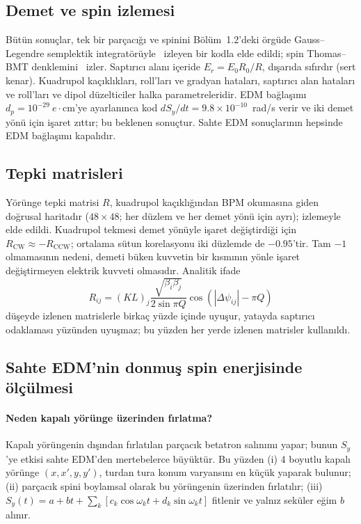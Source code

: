 \documentclass[12pt,a4paper]{extarticle}
\begin{document}
\subsection{Demet ve spin izlemesi}
Bütün sonuçlar, tek bir parçacığı ve spinini Bölüm~1.2'deki örgüde Gauss--Legendre semplektik
integratörüyle~\cite{hairer} izleyen bir kodla elde edildi; spin Thomas--BMT denklemini~\cite{bmt1959}
izler. Saptırıcı alanı içeride $E_r=E_0R_0/R$, dışarıda sıfırdır (sert kenar). Kuadrupol kaçıklıkları,
roll'ları ve gradyan hataları, saptırıcı alan hataları ve roll'ları ve dipol düzelticiler halka
parametreleridir. EDM bağlaşımı $d_p=10^{-29}~e\cdot$cm'ye ayarlanınca kod $dS_y/dt=9.8\times10^{-10}$~rad/s
verir ve iki demet yönü için işaret zıttır; bu beklenen sonuçtur. Sahte EDM sonuçlarının hepsinde EDM
bağlaşımı kapalıdır.

\subsection{Tepki matrisleri}
Yörünge tepki matrisi $R$, kuadrupol kaçıklığından BPM okumasına giden doğrusal haritadır ($48\times48$;
her düzlem ve her demet yönü için ayrı); izlemeyle elde edildi. Kuadrupol tekmesi demet yönüyle işaret
değiştirdiği için $R_\text{CW}\approx-R_\text{CCW}$; ortalama sütun korelasyonu iki düzlemde de $-0.95$'tir.
Tam $-1$ olmamasının nedeni, demeti büken kuvvetin bir kısmının yönle işaret değiştirmeyen elektrik kuvveti
olmasıdır. Analitik ifade
\begin{equation}
R_{ij}=(KL)_j\frac{\sqrt{\beta_i\beta_j}}{2\sin\pi Q}\cos(|\Delta\psi_{ij}|-\pi Q)
\label{eq:R}
\end{equation}
düşeyde izlenen matrislerle birkaç yüzde içinde uyuşur, yatayda saptırıcı odaklaması yüzünden uyuşmaz; bu
yüzden her yerde izlenen matrisler kullanıldı.

\subsection{Sahte EDM'nin donmuş spin enerjisinde ölçülmesi}\label{sec:donmus}
\paragraph{Neden kapalı yörünge üzerinden fırlatma?} Kapalı yörüngenin dışından fırlatılan parçacık
betatron salınımı yapar; bunun $S_y$'ye etkisi sahte EDM'den mertebelerce büyüktür. Bu yüzden (i) 4 boyutlu
kapalı yörünge $(x,x',y,y')$, turdan tura konum varyansını en küçük yaparak bulunur; (ii) parçacık spini
boylamsal olarak bu yörüngenin üzerinden fırlatılır; (iii) $S_y(t)=a+bt+\sum_k[c_k\cos\omega_kt+d_k\sin\omega_kt]$
fitlenir ve yalnız seküler eğim $b$ alınır.
\end{document}
